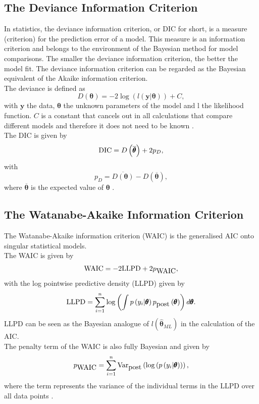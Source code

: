 \subsection{The Deviance Information Criterion}
In statistics, the deviance information criterion, or DIC for short, is a measure (criterion) for the prediction error of a model.
This measure is an information criterion and belongs to the environment of the Bayesian method for model comparisons. The smaller the deviance information criterion, the better the model fit. The deviance information criterion can be regarded as the Bayesian equivalent of the Akaike information criterion. \\
The deviance is defined as 
\begin{equation}
    D\left(\pmb{\theta}\right)=-2\log\left(l\left(\pmb{y}|\pmb{\theta}\right)\right)+C,
\end{equation}
with $\pmb{y}$ the data, $\pmb{\theta}$ the unknown parameters of the model and l the likelihood function. $C$ is a constant that cancels out in all calculations that compare different models and therefore it does not need to be known \autocite[][]{nelder1972generalized}. \\
The DIC is given by
\begin{equation}
    \hbox{DIC}=D\left(\overline{\pmb{\theta}}\right)+2p_D,
\end{equation}
with
\begin{equation}
    p_D=\overline{D\left(\pmb{\theta}\right)}-D\left(\overline{\pmb{\theta}}\right),
\end{equation}
where $\overline{\pmb{\theta}}$ is the expected value of $\pmb{\theta}$ \autocite[][]{spiegelhalter2014deviance}.
\subsection{The Watanabe-Akaike Information Criterion}
The Watanabe-Akaike information criterion (WAIC) is the generalised AIC onto singular statistical models. \\
The WAIC is given by
\begin{equation}
    \hbox{WAIC} = -2\hbox{LLPD}+2p_{\hbox{WAIC}},
\end{equation}
with the log pointwise predictive density (LLPD) given by
\begin{equation}
    \hbox{LLPD} = \sum_{i=1}^n\log\left(\int p\left(y_i|\pmb{\theta}\right)p_{\hbox{post}}\left(\pmb{\theta}\right)\right)d\pmb{\theta}.
\end{equation}
LLPD can be seen as the Bayesian analogue of $l\left(\widehat{\pmb{\theta}}_{ML}\right)$ in the calculation of the AIC.\\
The penalty term of the WAIC is also fully Bayesian and given by
\begin{equation}
    p_{\hbox{WAIC}}=\sum_{i=1}^n\hbox{Var}_{\hbox{post}}\left(\log\left(p\left(y_i|\pmb{\theta}\right)\right)\right),
\end{equation}
where the term represents the variance of the individual terms in the LLPD over all data points \autocite[][]{watanabe2010asymptotic, yong2018loo}.
